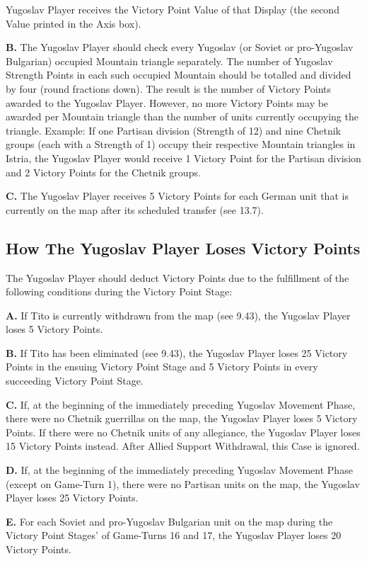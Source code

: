 Yugoslav Player receives the Victory Point Value of that Display (the second Value printed in the Axis box).

\textbf{B.} The Yugoslav Player should check every Yugoslav (or Soviet or pro-Yugoslav Bulgarian) occupied Mountain triangle separately. The number of Yugoslav Strength Points in each such occupied Mountain should be totalled and divided by four (round fractions down). The result is the number of Victory Points awarded to the Yugoslav Player. However, no more Victory Points may be awarded per Mountain triangle than the number of units currently occupying the triangle. Example: If one Partisan division (Strength of 12) and nine Chetnik groups (each with a Strength of 1) occupy their respective Mountain triangles in Istria, the Yugoslav Player would receive 1 Victory Point for the Partisan division and 2 Victory Points for the Chetnik groups.

\textbf{C.} The Yugoslav Player receives 5 Victory Points for each German unit that is currently on the map after its scheduled transfer (see 13.7).

\subsection{How The Yugoslav Player Loses Victory Points}\label{sec:14.3}

The Yugoslav Player should deduct Victory Points due to the fulfillment of the following conditions during the Victory Point Stage:

\textbf{A.} If Tito is currently withdrawn from the map (see 9.43), the Yugoslav Player loses 5 Victory Points.

\textbf{B.} If Tito has been eliminated (see 9.43), the Yugoslav Player loses 25 Victory Points in the ensuing Victory Point Stage and 5 Victory Points in every succeeding Victory Point Stage.

\textbf{C.} If, at the beginning of the immediately preceding Yugoslav Movement Phase, there were no Chetnik guerrillas on the map, the Yugoslav Player loses 5 Victory Points. If there were no Chetnik units of any allegiance, the Yugoslav Player loses 15 Victory Points instead. After Allied Support Withdrawal, this Case is ignored.

\textbf{D.} If, at the beginning of the immediately preceding Yugoslav Movement Phase (except on Game-Turn 1), there were no Partisan units on the map, the Yugoslav Player loses 25 Victory Points.

\textbf{E.} For each Soviet and pro-Yugoslav Bulgarian unit on the map during the Victory Point Stages' of Game-Turns 16 and 17, the Yugoslav Player loses 20 Victory Points.

